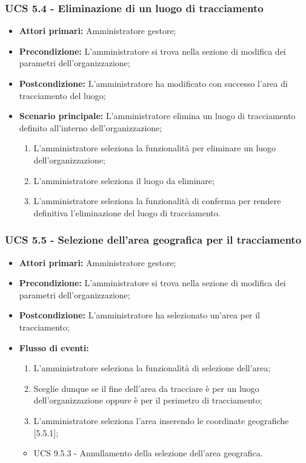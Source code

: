 \subsubsection{UCS 5.4 - Eliminazione di un luogo di tracciamento}%
\begin{itemize}
    \item \textbf{Attori primari:} Amministratore gestore;
    \item \textbf{Precondizione:} L'amministratore si trova nella sezione di modifica dei parametri dell'organizzazione;
    \item \textbf{Postcondizione:} L'amministratore ha modificato con successo l'area di tracciamento del luogo;
    \item \textbf{Scenario principale:} L'amministratore elimina un luogo di tracciamento definito all'interno dell'organizzazione;
    \begin{enumerate}%
        \item L'amministratore seleziona la funzionalità per eliminare un luogo dell'organizzazione;
        \item L'amministratore seleziona il luogo da eliminare;
        \item L'amministratore seleziona la funzionalità di conferma per rendere definitiva l'eliminazione del luogo di tracciamento.
    \end{enumerate}
\end{itemize}

\subsubsection{UCS 5.5 - Selezione dell'area geografica per il tracciamento}%
\begin{itemize}
\item \textbf{Attori primari:} Amministratore gestore;
\item \textbf{Precondizione:} L'amministratore si trova nella sezione di modifica dei parametri dell'organizzazione;
\item \textbf{Postcondizione:} L'amministratore ha selezionato un'area per il tracciamento;
\item \textbf{Flusso di eventi:}
\begin{enumerate}
    \item L'amministratore seleziona la funzionalità di selezione dell'area;
    \item Sceglie dunque se il fine dell'area da tracciare è per un luogo dell'organizzazione oppure è per il perimetro di tracciamento;
    \item L'amministratore seleziona l'area inserendo le coordinate geografiche [5.5.1];
\end{enumerate}
\begin{itemize}
    \item UCS 9.5.3 - Annullamento della selezione dell'area geografica.
\end{itemize}
\end{itemize}

